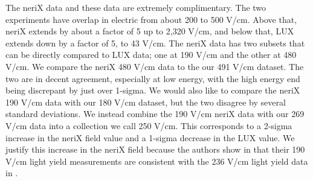 The neriX data and these data are extremely complimentary. The two experiments have overlap in electric from about 200 to 500 V/cm. Above that, neriX extends by about a factor of 5 up to 2,320 V/cm, and below that, LUX extends down by a factor of 5, to 43 V/cm. The neriX data has two subsets that can be directly compared to LUX data; one at 190 V/cm and the other at 480 V/cm. We compare the neriX 480 V/cm data to the our 491 V/cm dataset. The two are in decent agreement, especially at low energy, with the high energy end being discrepant by just over 1-sigma. We would also like to compare the neriX 190 V/cm data with our 180 V/cm dataset, but the two disagree by several standard deviations. We instead combine the 190 V/cm neriX data with our 269 V/cm data into a collection we call 250 V/cm. This corresponds to a 2-sigma increase in the neriX field value and a 1-sigma decrease in the LUX value. We justify this increase in the neriX field because the authors show in \cite{nerix} that their 190 V/cm light yield measurements are consistent with the 236 V/cm light yield data in \cite{xenon_tritium}.
